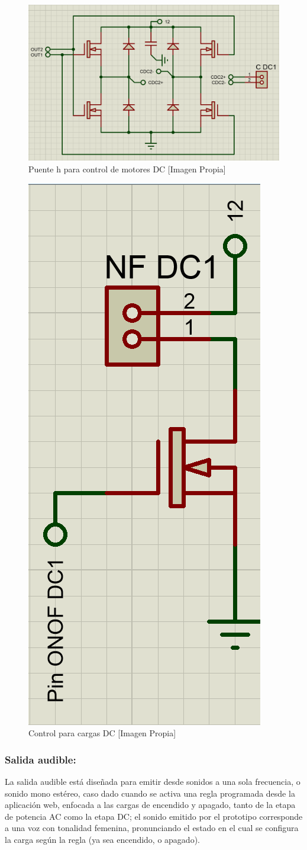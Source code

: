 		\begin{figure}[H]
			\centering
			\caption{Puente h para control de motores DC [Imagen Propia]}
			\label{fig:CDC}
			\includegraphics[width=0.7\linewidth]{Imagenes/CDC}
		\end{figure}
	
		\begin{figure}[H]
			\centering
			\caption{Control para cargas DC [Imagen Propia]}
			\label{fig:ONOFDC}
			\includegraphics[width=0.25\linewidth]{Imagenes/ONOFDC}
		\end{figure}
	
	\subsubsection{Salida audible:}
		La salida audible está diseñada para emitir desde sonidos a una sola frecuencia, o sonido mono estéreo, caso dado cuando se activa una regla programada desde la aplicación web, enfocada a las cargas de encendido y apagado, tanto de la etapa de potencia AC como la etapa DC; el sonido emitido por el prototipo corresponde a una voz con tonalidad femenina, pronunciando el estado en el cual se configura la carga según la regla (ya sea encendido, o apagado).\\
		
